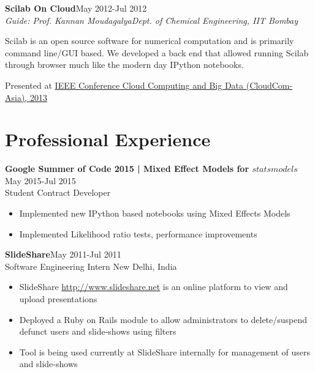 \documentclass[margin,line]{res}
\begin{document}
\begin{resume}
\vspace{.3cm}
\textbf{Scilab On Cloud}\hfill {May 2012-Jul 2012}\\
\textit{Guide: {Prof. Kannan Moudagalya}}\hfill{\textit{{Dept. of Chemical Engineering, IIT Bombay}}}

Scilab is an open source software for numerical computation and is primarily command line/GUI based.
We developed a back end that allowed running Scilab through browser much like the modern day
IPython notebooks.

Presented at \href{http://ieeexplore.ieee.org/xpls/abs_all.jsp?arnumber=6821028}{IEEE Conference Cloud Computing and Big Data (CloudCom-Asia), 2013 }


\section{\sc Professional Experience}

\textbf{Google Summer of Code 2015 | Mixed Effect Models for $statsmodels$}\hfill {May 2015-Jul 2015}\\
{Student Contract Developer}\\
\begin{itemize}
\item Implemented new IPython based notebooks using Mixed Effects Models
\item Implemented Likelihood ratio tests, performance improvements
\end{itemize}
\pagebreak

\textbf{SlideShare}\hfill{May 2011-Jul 2011}\\
{Software Engineering Intern} \hfill{New Delhi, India}\\
\begin{itemize}
\item SlideShare \url{http://www.slideshare.net} is an online platform to view and upload presentations
\item{Deployed a Ruby on Rails module  to allow administrators to delete/suspend defunct users and slide-shows using filters}
\item {Tool is being used currently at SlideShare internally for management of users and slide-shows}
\end{itemize}


\end{resume}
\end{document}
